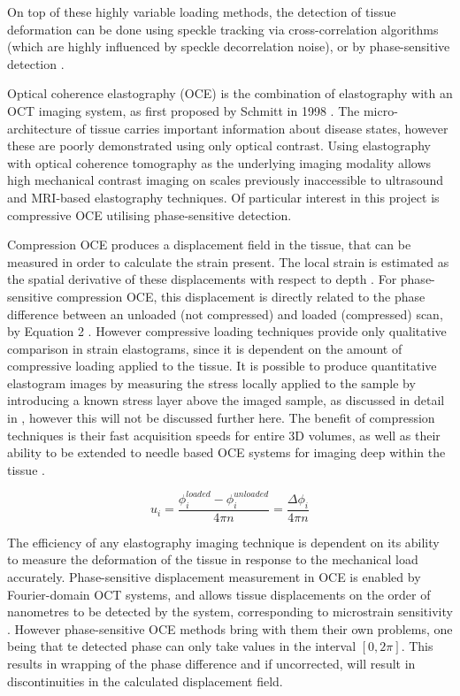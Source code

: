 On top of these highly variable loading methods, the detection of tissue deformation can be done using speckle tracking via cross-correlation algorithms (which are highly influenced by speckle decorrelation noise), or by phase-sensitive detection \cite{kennedy_strain_2012}.

Optical coherence elastography (OCE) is the combination of elastography with an OCT imaging system, as first proposed by Schmitt in 1998 \cite{schmitt_oct_1998}. The micro-architecture of tissue carries important information about disease states, however these are poorly demonstrated using only optical contrast. Using elastography with optical coherence tomography as the underlying imaging modality allows high mechanical contrast imaging on scales previously inaccessible to ultrasound and MRI-based elastography techniques. Of particular interest in this project is compressive OCE utilising phase-sensitive detection. 

Compression OCE produces a displacement field in the tissue, that can be measured in order to calculate the strain present. The local strain is estimated as the spatial derivative of these displacements with respect to depth \cite{kennedy_review_2014}. For phase-sensitive compression OCE, this displacement is directly related to the phase difference between an unloaded (not compressed) and loaded (compressed) scan, by Equation 2 \cite{kennedy_strain_2012}. However compressive loading techniques provide only qualitative comparison in strain elastograms, since it is dependent on the amount of compressive loading applied to the tissue. It is possible to produce quantitative elastogram images by measuring the stress locally applied to the sample by introducing a known stress layer above the imaged sample, as discussed in detail in \cite{kennedy_quantitative_2015}, however this will not be discussed further here. The benefit of compression techniques is their fast acquisition speeds for entire 3D volumes, as well as their ability to be extended to needle based OCE systems for imaging deep within the tissue \cite{kennedy_review_2014}. 

\begin{equation}
u_i = \frac{\phi_i^{loaded}-\phi_i^{unloaded}}{4\pi n} = \frac{\Delta\phi_i}{4\pi n}
\end{equation}

The efficiency of any elastography imaging technique is dependent on its ability to measure the deformation of the tissue in response to the mechanical load accurately. Phase-sensitive displacement measurement in OCE is enabled by Fourier-domain OCT systems, and allows tissue displacements on the order of nanometres to be detected by the system, corresponding to microstrain sensitivity \cite{kennedy_review_2014}. However phase-sensitive OCE methods bring with them their own problems, one being that te detected phase can only take values in the interval $[0,2\pi]$. This results in wrapping of the phase difference and if uncorrected, will result in discontinuities in the calculated displacement field.

